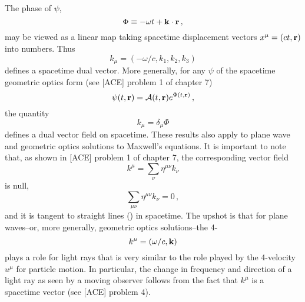 The phase of $\psi$, 
\begin{equation}\label{eq:Wald_08.21}
\Phi \equiv -\omega t +  \vb{k}\cdot\vb{r} \,,
\end{equation}
may be viewed as a linear map taking spacetime displacement vectors $x^\mu = (ct, \vb{r})$ into numbers. Thus 
\begin{equation}\label{eq:Wald_08.22}
k_\mu = (-\omega/c, k_1, k_2, k_3)
\end{equation}
defines a spacetime dual vector. More generally, for any $\psi$ of the spacetime geometric optics form (see [ACE] problem 1 of chapter 7)
\begin{equation}\label{eq:Wald_08.23}
\psi(t, \vb{r}) = \A(t, \vb{r}) \vexp{\Phi(t, \vb{r})}\,,
\end{equation}
the quantity 
\begin{equation}\label{eq:Wald_08.24}
k_\mu = \delta_\mu \Phi
\end{equation}
defines a dual vector field on spacetime. These results also apply to plane wave and geometric optics solutions to Maxwell's equations. It is important to note that, as shown in [ACE] problem 1 of chapter 7, the corresponding vector field 
\begin{equation}\label{eq:Wald_08.25}
k^\mu = \sum_\nu \eta^{\mu\nu} k_\nu
\end{equation}
is null, $$ \sum_{\mu\nu} \eta^{\mu\nu} k_\nu = 0\,,$$
and it is tangent to straight lines () in spacetime. The upshot is that for plane waves--or, more generally, geometric optics solutions--the  4-
\begin{equation}\label{eq:Wald_08.26}
k^\mu = (\omega/c, \vb{k})
\end{equation}
plays a role for light rays that is very similar to the role played by the 4-velocity $u^\mu$ for particle motion. In particular, the change in frequency and direction of a light ray as seen by a moving observer follows from the fact that $k^\mu$ is a spacetime vector (see [ACE] problem 4).

